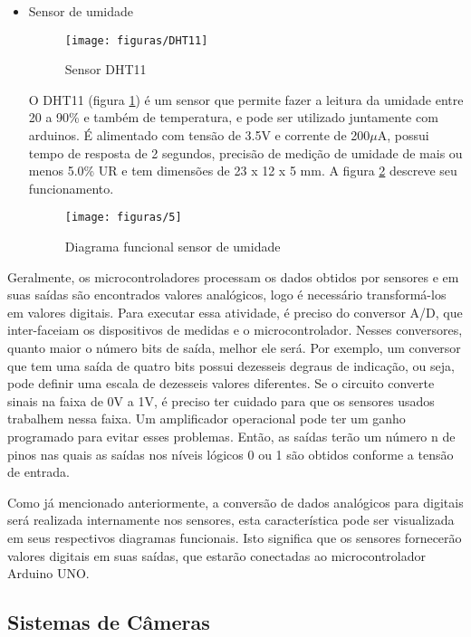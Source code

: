 \begin{itemize}
  \item Sensor de umidade

		\begin{figure}[H]
			\centering
			\caption{Sensor DHT11}
			\label{img:DHT11}
			\texttt{[image: figuras/DHT11]}
		\end{figure}

		O DHT11 (figura \ref{img:DHT11}) é um sensor que permite fazer a leitura da umidade entre 20 a 90\% e também de temperatura, e pode ser utilizado juntamente com arduinos. É alimentado com tensão de 3.5V e corrente de 200$\mu$A, possui tempo de resposta de 2 segundos, precisão de medição de umidade de mais ou menos 5.0\% UR e tem dimensões de 23 x 12 x 5 mm. A figura \ref{img:sensorumidade} descreve seu funcionamento.

	  \begin{figure}[H]
	    \centering
	    \caption[Diagrama funcional sensor de umidade]{Diagrama funcional sensor de umidade~\cite{sensorhumidade}}
	    \label{img:sensorumidade}
	    \texttt{[image: figuras/5]}
	  \end{figure}
\end{itemize}

Geralmente, os microcontroladores processam os dados obtidos por sensores e em suas saídas são encontrados valores analógicos, logo é necessário transformá-los em valores digitais. Para executar essa atividade, é preciso do conversor A/D, que inter-faceiam os dispositivos de medidas e o microcontrolador. Nesses conversores, quanto maior o número bits de saída, melhor ele será. Por exemplo, um conversor que tem uma saída de quatro bits possui dezesseis degraus de indicação, ou seja, pode definir uma escala de dezesseis valores diferentes. Se o circuito converte sinais na faixa de 0V a 1V, é preciso ter cuidado para que os sensores usados trabalhem nessa faixa. Um amplificador operacional pode ter um ganho programado para evitar esses problemas. Então, as saídas terão um número n de pinos nas quais as saídas nos níveis lógicos 0 ou 1 são obtidos conforme a tensão de entrada.

Como já mencionado anteriormente, a conversão de dados analógicos para digitais será realizada internamente nos sensores, esta característica pode ser visualizada em seus respectivos diagramas funcionais. Isto significa que os sensores fornecerão valores digitais em suas saídas, que estarão conectadas ao microcontrolador Arduino UNO.

\subsection{Sistemas de Câmeras}

